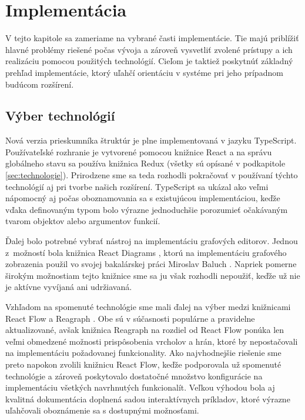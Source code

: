 \chapter{Implementácia}
\label{kap:implementation}
V tejto kapitole sa zameriame na vybrané časti implementácie. Tie majú priblížiť hlavné problémy riešené počas vývoja a zároveň vysvetliť zvolené prístupy a ich realizáciu pomocou použitých technológií. Cieľom je taktiež poskytnúť základný prehľad implementácie, ktorý uľahčí orientáciu v systéme pri jeho prípadnom budúcom rozšírení.

\section{Výber technológií}
Nová verzia prieskumníka štruktúr je plne implementovaná v jazyku TypeScript. Používateľské rozhranie je vytvorené pomocou knižnice React a na správu globálneho stavu sa používa knižnica Redux (všetky sú opísané v podkapitole \ref{sec:technologie}). Prirodzene sme sa teda rozhodli pokračovať v používaní týchto technológií aj pri tvorbe našich rozšírení. TypeScript sa ukázal ako veľmi nápomocný aj počas oboznamovania sa s existujúcou implementáciou, keďže vďaka definovaným typom bolo výrazne jednoduchšie porozumieť očakávaným tvarom objektov alebo argumentov funkcií.

Ďalej bolo potrebné vybrať nástroj na implementáciu grafových editorov. Jednou z~možností bola knižnica React Diagrams \cite{reactdiagrams}, ktorú na implementáciu grafového zobrazenia použil vo svojej bakalárskej práci Miroslav Baluch \cite{baluch2020}. Napriek pomerne širokým možnostiam tejto knižnice sme sa ju však rozhodli nepoužiť, keďže už nie je aktívne vyvíjaná ani udržiavaná.

Vzhľadom na spomenuté technológie sme mali ďalej na výber medzi knižnicami React Flow \cite{reactflow} a Reagraph \cite{reagraph}. Obe sú v súčasnosti populárne a pravidelne aktualizované, avšak knižnica Reagraph na rozdiel od React Flow ponúka len veľmi obmedzené možnosti prispôsobenia vrcholov a hrán, ktoré by nepostačovali na implementáciu požadovanej funkcionality. Ako najvhodnejšie riešenie sme preto napokon zvolili knižnicu React Flow, keďže podporovala už spomenuté technológie a zároveň poskytovalo dostatočné množstvo konfigurácie na implementáciu všetkých navrhnutých funkcionalít. Veľkou výhodou bola aj kvalitná dokumentácia doplnená sadou interaktívnych príkladov, ktoré výrazne uľahčovali oboznámenie sa s dostupnými možnosťami.

